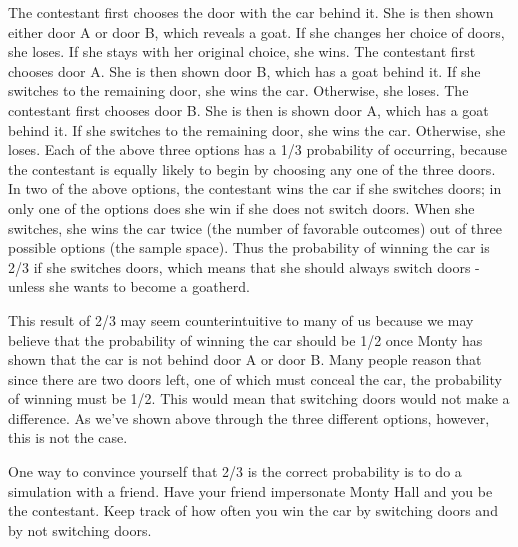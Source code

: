 \documentclass[12pt,a4paper]{article}
\begin{document}
\begin{titlepage}
The contestant first chooses the door with the car behind it. She is then shown either door A or door B, which reveals a goat. If she changes her choice of doors, she loses. If she stays with her original choice, she wins.
The contestant first chooses door A. She is then shown door B, which has a goat behind it. If she switches to the remaining door, she wins the car. Otherwise, she loses.
The contestant first chooses door B. She is then is shown door A, which has a goat behind it. If she switches to the remaining door, she wins the car. Otherwise, she loses.
Each of the above three options has a 1/3 probability of occurring, because the contestant is equally likely to begin by choosing any one of the three doors. In two of the above options, the contestant wins the car if she switches doors; in only one of the options does she win if she does not switch doors. When she switches, she wins the car twice (the number of favorable outcomes) out of three possible options (the sample space). Thus the probability of winning the car is 2/3 if she switches doors, which means that she should always switch doors - unless she wants to become a goatherd.

This result of 2/3 may seem counterintuitive to many of us because we may believe that the probability of winning the car should be 1/2 once Monty has shown that the car is not behind door A or door B. Many people reason that since there are two doors left, one of which must conceal the car, the probability of winning must be 1/2. This would mean that switching doors would not make a difference. As we've shown above through the three different options, however, this is not the case.

One way to convince yourself that 2/3 is the correct probability is to do a simulation with a friend. Have your friend impersonate Monty Hall and you be the contestant. Keep track of how often you win the car by switching doors and by not switching doors.



\end{titlepage}
\end{document}
